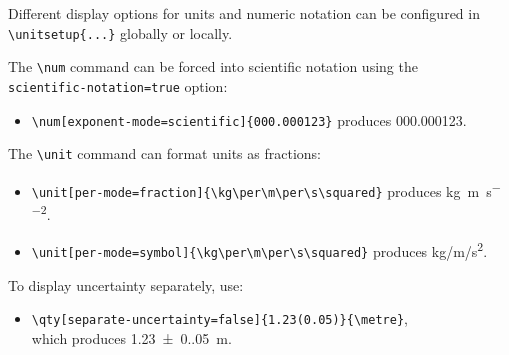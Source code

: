 Different display options for units and numeric notation can be configured in \\
 \verb|\unitsetup{...}| globally or locally.

The \verb|\num| command can be forced into scientific notation using the\\
\verb|scientific-notation=true| option:

\begin{itemize}
    \item \verb|\num[exponent-mode=scientific]{000.000123}| produces \num[exponent-mode=scientific]{000.000123}.
\end{itemize}

The \verb|\unit| command can format units as fractions:
\begin{itemize}
    \item \verb|\unit[per-mode=fraction]{\kg\per\m\per\s\squared}| produces \unit[per-mode=fraction]{\kg\per\m\per\s\squared}.
    \item \verb|\unit[per-mode=symbol]{\kg\per\m\per\s\squared}| produces \unit[per-mode=symbol]{\kg\per\m\per\s\squared}.
\end{itemize}

To display uncertainty separately, use:
\begin{itemize}
    \item \verb|\qty[separate-uncertainty=false]{1.23(0.05)}{\metre}|, \\
        which produces \qty[separate-uncertainty=false]{1.23(0.05)}{\metre}.
\end{itemize}

















\endgroup